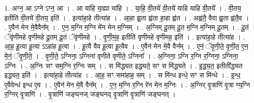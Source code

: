 \documentclass[17pt]{extarticle}
\begin{document}
1. अग्न॒ आ ऽग्ने ऽग्न॒ आ । . आ या॑हि या॒ह्या या॑हि । . या॒हि॒ वी॒तये॑ वी॒तये॑ याहि याहि वी॒तये᳚ । . वी॒तय॒ इतीति॑ वी॒तये॑ वी॒तय॒ इति॑ । . इत्या॑हा॒हे तीत्या॑ह । . आ॒हा ह्व॒ता ह्व॑ता हा॒हा ह्व॑त । . अह्व॑तै॒ वैवा ह्व॒ता ह्व॑तै॒व । . ए॒वैन॑ मेन मे॒वैवैन᳚म् । . ए॒न॒ म॒ग्नि म॒ग्नि मे॑न मेन म॒ग्निम् । . अ॒ग्निम् दू॒तम् दू॒त म॒ग्नि म॒ग्निम् दू॒तम् । . दू॒तं ॅवृ॑णीमहे वृणीमहे दू॒तम् दू॒तं ॅवृ॑णीमहे । . वृ॒णी॒म॒ह॒ इतीति॑ वृणीमहे वृणीमह॒ इति॑ । . इत्या॑हा॒हे तीत्या॑ह । . आ॒ह॒ हू॒त्वा हू॒त्वा ऽऽहा॑ह हू॒त्वा । . हू॒त्वै वैव हू॒त्वा हू॒त्वैव । . ए॒वैन॑ मेन मे॒वै वैन᳚म् । . ए॒नं॒ ॅवृ॒णी॒ते॒ वृ॒णी॒त॒ ए॒न॒ मे॒नं॒ ॅवृ॒णी॒ते॒ । . वृ॒णी॒ते॒ ऽग्निना॒ ऽग्निना॑ वृणीते वृणीते॒ ऽग्निना᳚ । . अ॒ग्निना॒ ऽग्नि र॒ग्नि र॒ग्निना॒ ऽग्निना॒ ऽग्निः । . अ॒ग्निः सꣳ सम॒ग्नि र॒ग्निः सम् । . स मि॑द्ध्यत इद्ध्यते॒ सꣳ स मि॑द्ध्यते । . इ॒द्ध्य॒त॒ इतीती᳚द्ध्यत इद्ध्यत॒ इति॑ । . इत्या॑हा॒हे तीत्या॑ह । . आ॒ह॒ सꣳ समा॑हाह॒ सम् । . स मि॑न्ध इन्धे॒ सꣳ स मि॑न्धे । . इ॒न्ध॒ ए॒वैवेन्ध॑ इन्ध ए॒व । . ए॒वैन॑ मेन मे॒वै वैन᳚म् । . ए॒न॒ म॒ग्नि र॒ग्नि रे॑न मेन म॒ग्निः । . अ॒ग्निर् वृ॒त्राणि॑ वृ॒त्रा ण्य॒ग्नि र॒ग्निर् वृ॒त्राणि॑ । . वृ॒त्राणि॑ जङ्घनज् जङ्घनद् वृ॒त्राणि॑ वृ॒त्राणि॑ जङ्घनत् । \newline
\end{document}
